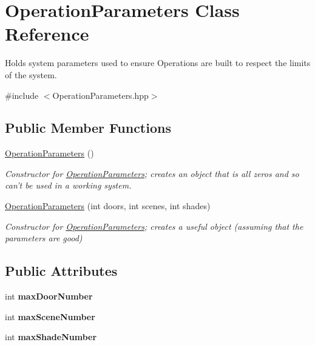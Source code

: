 \hypertarget{classOperationParameters}{\section{Operation\-Parameters Class Reference}
\label{classOperationParameters}
}


Holds system parameters used to ensure Operations are built to respect the limits of the system.  




{\ttfamily \#include $<$Operation\-Parameters.\-hpp$>$}

\subsection*{Public Member Functions}
\begin{DoxyCompactItemize}
\item 
\hypertarget{classOperationParameters_a7cc8e713b7a6cc12c9eef42c88ec1109}{\hyperlink{classOperationParameters_a7cc8e713b7a6cc12c9eef42c88ec1109}{Operation\-Parameters} ()}\label{classOperationParameters_a7cc8e713b7a6cc12c9eef42c88ec1109}

\begin{DoxyCompactList}\small\item\em Constructor for \hyperlink{classOperationParameters}{Operation\-Parameters}; creates an object that is all zeros and so can't be used in a working system. \end{DoxyCompactList}\item 
\hyperlink{classOperationParameters_a6612fc100361e96ad9dc3310d3033f44}{Operation\-Parameters} (int doors, int scenes, int shades)
\begin{DoxyCompactList}\small\item\em Constructor for \hyperlink{classOperationParameters}{Operation\-Parameters}; creates a useful object (assuming that the parameters are good) \end{DoxyCompactList}\end{DoxyCompactItemize}
\subsection*{Public Attributes}
\begin{DoxyCompactItemize}
\item 
\hypertarget{classOperationParameters_aad3af0d084a3e55d4b7595b0ee5e609d}{int {\bfseries max\-Door\-Number}}\label{classOperationParameters_aad3af0d084a3e55d4b7595b0ee5e609d}

\item 
\hypertarget{classOperationParameters_a6fd5bb82965ea3eb27bce419faabd9fc}{int {\bfseries max\-Scene\-Number}}\label{classOperationParameters_a6fd5bb82965ea3eb27bce419faabd9fc}

\item 
\hypertarget{classOperationParameters_a50268d382e63ed6f25271b13b4342be1}{int {\bfseries max\-Shade\-Number}}\label{classOperationParameters_a50268d382e63ed6f25271b13b4342be1}

\end{DoxyCompactItemize}


